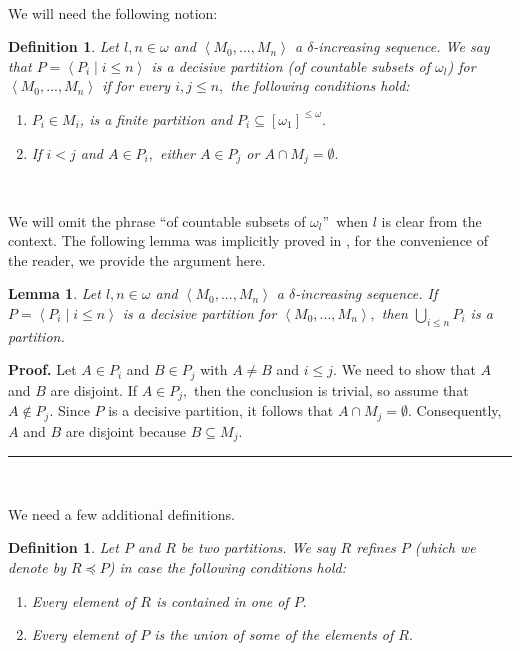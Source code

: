 \documentclass{article}%
\newtheorem{definition}[theorem]{Definition}
\newtheorem{lemma}[theorem]{Lemma}
\newenvironment{proof}[1][Proof]{\noindent\textbf{#1.} }{\ \rule{0.5em}{0.5em}}
\begin{document}
\qquad\qquad\ \ \ \ \ 

We will need the following notion:

\begin{definition}
Let $l,n\in\omega$ and $\left\langle M_{0},...,M_{n}\right\rangle $ a $\delta
$-increasing sequence. We say that $P=\left\langle P_{i}\mid i\leq
n\right\rangle $ \emph{is a decisive partition (of countable subsets of
}$\omega_{l}$\emph{) for} $\left\langle M_{0},...,M_{n}\right\rangle $ if for
every $i,j\leq n,$ the following conditions hold:

\begin{enumerate}
\item $P_{i}\in M_{i}$, is a finite partition and $P_{i}\subseteq\left[
\omega_{1}\right]  ^{\leq\omega}.$

\item If $i<j$ and $A\in P_{i},$ either $A\in P_{j}$ or $A\cap M_{j}%
=\emptyset.$
\end{enumerate}
\end{definition}

\qquad\ \qquad\ \ \ 

We will omit the phrase \textquotedblleft of countable subsets of $\omega_{l}%
$\textquotedblright\ when $l$ is clear from the context. The following lemma
was implicitly proved in \cite{PFiltersCohenRandomLaver}, for the convenience
of the reader, we provide the argument here.

\begin{lemma}
Let $l,n\in\omega$ and $\left\langle M_{0},...,M_{n}\right\rangle $ a $\delta
$-increasing sequence. If $P=\left\langle P_{i}\mid i\leq n\right\rangle $ is
a decisive partition for $\left\langle M_{0},...,M_{n}\right\rangle ,$ then
$\bigcup\limits_{i\leq n}P_{i}$ is a partition.
\end{lemma}

\begin{proof}
Let $A\in P_{i}$ and $B\in P_{j}$ with $A\neq B$ and $i\leq j.$ We need to
show that $A$ and $B$ are disjoint. If $A\in P_{j},$ then the conclusion is
trivial, so assume that $A\notin P_{j}$. Since $P$ is a decisive partition, it
follows that $A\cap M_{j}=\emptyset.$ Consequently, $A$ and $B$ are disjoint
because $B\subseteq M_{j}.$
\end{proof}

\qquad\ \ \qquad\ \ 

We need a few additional definitions.

\begin{definition}
Let $P$ and $R$ be two partitions. We say $R$ \emph{refines} $P$ (which we
denote by $R\preceq P$) in case the following conditions hold:

\begin{enumerate}
\item Every element of $R$ is contained in one of $P.$

\item Every element of $P$ is the union of some of the elements of $R.$
\end{enumerate}
\end{definition}
\end{document}
